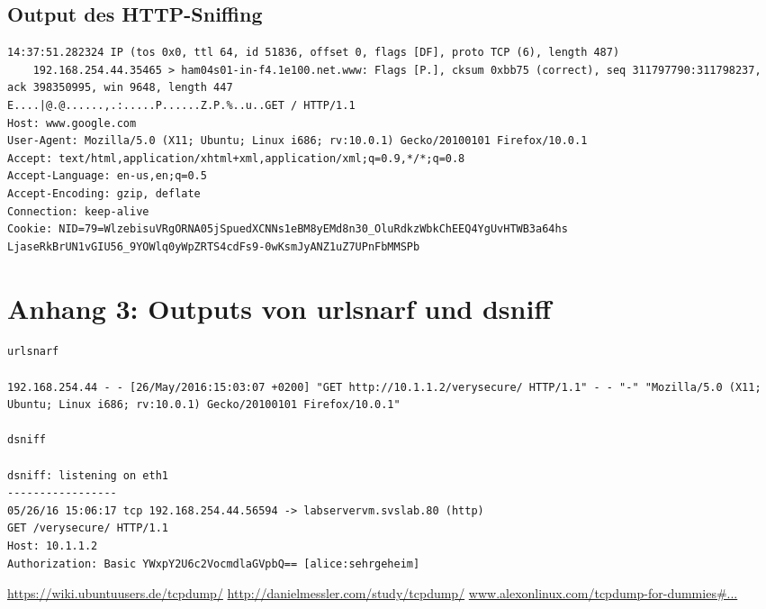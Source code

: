 \documentclass[twoside]{article}
\begin{document}
\subsection*{Output des HTTP-Sniffing}
\begin{lstlisting}
14:37:51.282324 IP (tos 0x0, ttl 64, id 51836, offset 0, flags [DF], proto TCP (6), length 487)
    192.168.254.44.35465 > ham04s01-in-f4.1e100.net.www: Flags [P.], cksum 0xbb75 (correct), seq 311797790:311798237, ack 398350995, win 9648, length 447
E....|@.@......,.:.....P......Z.P.%..u..GET / HTTP/1.1
Host: www.google.com
User-Agent: Mozilla/5.0 (X11; Ubuntu; Linux i686; rv:10.0.1) Gecko/20100101 Firefox/10.0.1
Accept: text/html,application/xhtml+xml,application/xml;q=0.9,*/*;q=0.8
Accept-Language: en-us,en;q=0.5
Accept-Encoding: gzip, deflate
Connection: keep-alive
Cookie: NID=79=WlzebisuVRgORNA05jSpuedXCNNs1eBM8yEMd8n30_OluRdkzWbkChEEQ4YgUvHTWB3a64hs LjaseRkBrUN1vGIU56_9YOWlq0yWpZRTS4cdFs9-0wKsmJyANZ1uZ7UPnFbMMSPb
\end{lstlisting}

\section*{Anhang 3: Outputs von urlsnarf und dsniff}
\begin{lstlisting}
urlsnarf

192.168.254.44 - - [26/May/2016:15:03:07 +0200] "GET http://10.1.1.2/verysecure/ HTTP/1.1" - - "-" "Mozilla/5.0 (X11; Ubuntu; Linux i686; rv:10.0.1) Gecko/20100101 Firefox/10.0.1"

dsniff

dsniff: listening on eth1
-----------------
05/26/16 15:06:17 tcp 192.168.254.44.56594 -> labservervm.svslab.80 (http)
GET /verysecure/ HTTP/1.1
Host: 10.1.1.2
Authorization: Basic YWxpY2U6c2VocmdlaGVpbQ== [alice:sehrgeheim] 
\end{lstlisting}

\begin{thebibliography}{1}
		\url{https://wiki.ubuntuusers.de/tcpdump/}
		\url{http://danielmessler.com/study/tcpdump/}
			\url{www.alexonlinux.com/tcpdump-for-dummies\#...}
\end{thebibliography}
\end{document}
